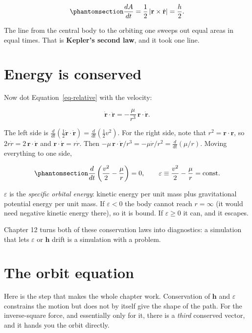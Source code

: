 \documentclass[
  10.5pt,
  letterpaper,
]{scrbook}
\theoremstyle{plain}
\theoremstyle{remark}
\begin{document}
\begin{equation}\protect\phantomsection\label{eq-areal}{
\frac{dA}{dt} = \frac{1}{2}\,|\mathbf{r} \times \dot{\mathbf{r}}| = \frac{h}{2}.
}\end{equation}

The line from the central body to the orbiting one sweeps out equal
areas in equal times. That is \textbf{Kepler's second law}, and it took
one line.

\section{Energy is conserved}\label{energy-is-conserved}

Now dot Equation~\ref{eq-relative} with the velocity:

\[
\dot{\mathbf{r}}\cdot\ddot{\mathbf{r}} = -\frac{\mu}{r^3}\,\mathbf{r}\cdot\dot{\mathbf{r}}.
\]

The left side is
\(\frac{d}{dt}\left(\tfrac12 \dot{\mathbf{r}}\cdot\dot{\mathbf{r}}\right) = \frac{d}{dt}\left(\tfrac12 v^2\right)\).
For the right side, note that \(r^2 = \mathbf{r}\cdot\mathbf{r}\), so
\(2r\dot{r} = 2\,\mathbf{r}\cdot\dot{\mathbf{r}}\) and
\(\mathbf{r}\cdot\dot{\mathbf{r}} = r\dot{r}\). Then
\(-\mu\,\mathbf{r}\cdot\dot{\mathbf{r}}/r^3 = -\mu\dot{r}/r^2 = \frac{d}{dt}(\mu/r)\).
Moving everything to one side,

\begin{equation}\protect\phantomsection\label{eq-energy}{
\frac{d}{dt}\left(\frac{v^2}{2} - \frac{\mu}{r}\right) = 0, \qquad
\varepsilon \equiv \frac{v^2}{2} - \frac{\mu}{r} = \text{const}.
}\end{equation}

\(\varepsilon\) is the \emph{specific orbital energy}: kinetic energy
per unit mass plus gravitational potential energy per unit mass. If
\(\varepsilon < 0\) the body cannot reach \(r = \infty\) (it would need
negative kinetic energy there), so it is bound. If \(\varepsilon \ge 0\)
it can, and it escapes.

Chapter 12 turns both of these conservation laws into diagnostics: a
simulation that lets \(\varepsilon\) or \(\mathbf{h}\) drift is a
simulation with a problem.

\section{The orbit equation}\label{the-orbit-equation}

Here is the step that makes the whole chapter work. Conservation of
\(\mathbf{h}\) and \(\varepsilon\) constrains the motion but does not by
itself give the shape of the path. For the inverse-square force, and
essentially only for it, there is a \emph{third} conserved vector, and
it hands you the orbit directly.
\end{document}
